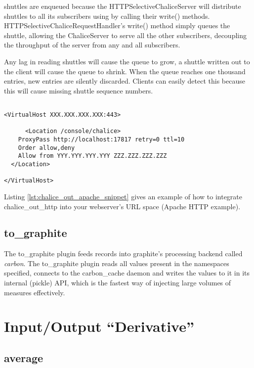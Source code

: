 shuttles are enqueued because the HTTPSelectiveChaliceServer will
distribute shuttles to all its subscribers using by calling their
write() methods.  HTTPSelectiveChaliceRequestHandler's write() method
simply queues the shuttle, allowing the ChaliceServer to serve all the
other subscribers, decoupling the throughput of the server from any and
all subscribers.

Any lag in reading shuttles will cause the queue to grow, a shuttle
written out to the client will cause the queue to shrink. When the queue
reaches one thousand entries, new entries are silently discarded. Clients
can easily detect this because this will cause missing shuttle sequence
numbers.

\begin{lstlisting}[caption=Integrating chalice\_out\_http
,label=lst:chalice_out_apache_snippet]

<VirtualHost XXX.XXX.XXX.XXX:443>

	  <Location /console/chalice>
    ProxyPass http://localhost:17817 retry=0 ttl=10
    Order allow,deny
    Allow from YYY.YYY.YYY.YYY ZZZ.ZZZ.ZZZ.ZZZ
  </Location>

</VirtualHost>
\end{lstlisting}

Listing \ref{lst:chalice_out_apache_snippet} gives an example of how
to integrate chalice\_out\_http into your webserver's URL space (Apache
HTTP example).

\subsection{to\_graphite}

The to\_graphite plugin feeds records into graphite's processing backend
called \emph{carbon}. The to\_graphite plugin reads
all values present in the namespaces specified, connects
to the carbon\_cache daemon and writes the values to it in its internal
(pickle) API, which is the fastest way of injecting large volumes of
measures effectively.

\section{Input\slash{}Output ``Derivative'' \witches{}}

\subsection{average}

